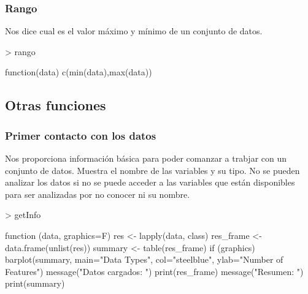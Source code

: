 \documentclass [a4paper] {article}
\begin{document}
\subsubsection{Rango}
Nos dice cual es el valor máximo y mínimo de un conjunto de datos.
\begin{Schunk}
\begin{Sinput}
> rango
\end{Sinput}
\begin{Soutput}
function(data){
  c(min(data),max(data))
}
\end{Soutput}
\end{Schunk}

\newpage
\subsection{Otras funciones}
\subsubsection{Primer contacto con los datos}
Nos proporciona información básica para poder comanzar a trabjar con un conjunto de datos.
Muestra el nombre de las variables y su tipo.
No se pueden analizar los datos si no se puede acceder a las variables que están disponibles para ser analizadas por no conocer ni su nombre.
\begin{Schunk}
\begin{Sinput}
> getInfo
\end{Sinput}
\begin{Soutput}
function (data, graphics=F) {
  res <- lapply(data, class)
  res_frame <- data.frame(unlist(res))
  summary <- table(res_frame)
  if (graphics){
    barplot(summary, main="Data Types", col="steelblue", ylab="Number of Features")
  }
  message("Datos cargados: ")
  print(res_frame)
  message("Resumen: ")
  print(summary)
}
\end{Soutput}
\end{Schunk}
\end{document}
